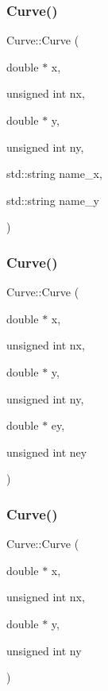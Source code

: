 \subsubsection{\texorpdfstring{Curve()}{Curve()}\hspace{0.1cm}{\footnotesize\ttfamily [2/6]}}
{\footnotesize\ttfamily Curve\+::\+Curve (\begin{DoxyParamCaption}\item[{double $\ast$}]{x,  }\item[{unsigned int}]{nx,  }\item[{double $\ast$}]{y,  }\item[{unsigned int}]{ny,  }\item[{std\+::string}]{name\+\_\+x,  }\item[{std\+::string}]{name\+\_\+y }\end{DoxyParamCaption})}

\mbox{\label{class_curve_aff266ab3a4e4d4b40555692e67c3a914}} 
\subsubsection{\texorpdfstring{Curve()}{Curve()}\hspace{0.1cm}{\footnotesize\ttfamily [3/6]}}
{\footnotesize\ttfamily Curve\+::\+Curve (\begin{DoxyParamCaption}\item[{double $\ast$}]{x,  }\item[{unsigned int}]{nx,  }\item[{double $\ast$}]{y,  }\item[{unsigned int}]{ny,  }\item[{double $\ast$}]{ey,  }\item[{unsigned int}]{ney }\end{DoxyParamCaption})}

\mbox{\label{class_curve_a56ee024f888ced5ca73b38bde3fbc7aa}} 
\subsubsection{\texorpdfstring{Curve()}{Curve()}\hspace{0.1cm}{\footnotesize\ttfamily [4/6]}}
{\footnotesize\ttfamily Curve\+::\+Curve (\begin{DoxyParamCaption}\item[{double $\ast$}]{x,  }\item[{unsigned int}]{nx,  }\item[{double $\ast$}]{y,  }\item[{unsigned int}]{ny }\end{DoxyParamCaption})}


